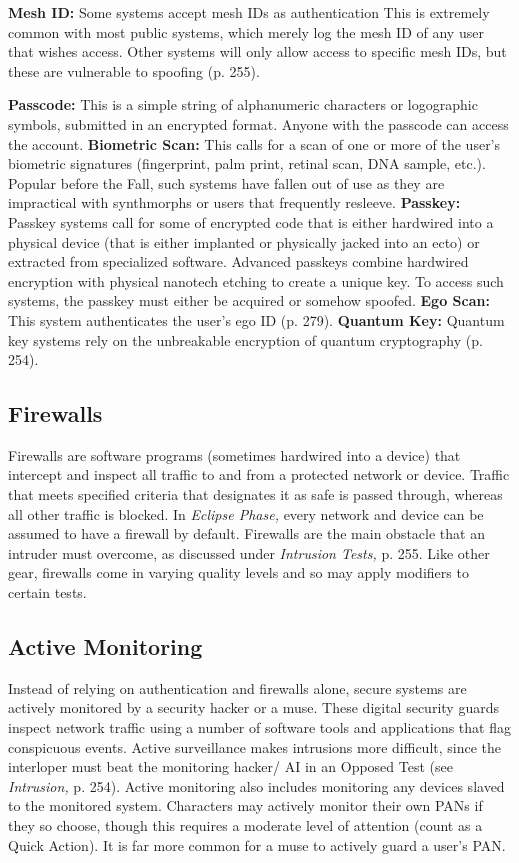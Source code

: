 \textbf{Mesh ID:} Some systems accept mesh IDs as authentication
This is extremely common with most public
systems, which merely log the mesh ID of any user 
that wishes access. Other systems will only allow 
access to specific mesh IDs, but these are vulnerable 
to spoofing (p. 255).

\textbf{Passcode:} This is a simple string of alphanumeric 
characters or logographic symbols, submitted in an 
encrypted format. Anyone with the passcode can 
access the account.
\textbf{Biometric Scan:} This calls for a scan of one or more 
of the user's biometric signatures (fingerprint, palm 
print, retinal scan, DNA sample, etc.). Popular before 
the Fall, such systems have fallen out of use as they 
are impractical with synthmorphs or users that frequently
resleeve.
\textbf{Passkey:} Passkey systems call for some of encrypted 
code that is either hardwired into a physical device 
(that is either implanted or physically jacked into 
an ecto) or extracted from specialized software. Advanced
passkeys combine hardwired encryption with
physical nanotech etching to create a unique key. To 
access such systems, the passkey must either be acquired
or somehow spoofed.
\textbf{Ego Scan:} This system authenticates the user's ego 
ID (p. 279).
\textbf{Quantum Key:} Quantum key systems rely on the unbreakable
encryption of quantum cryptography (p. 254).

\subsection{Firewalls}

Firewalls are software programs (sometimes hardwired
into a device) that intercept and inspect all traffic
to and from a protected network or device. Traffic
that meets specified criteria that designates it as safe 
is passed through, whereas all other traffic is blocked. 
In \textit{Eclipse Phase,} every network and device can be 
assumed to have a firewall by default. Firewalls are 
the main obstacle that an intruder must overcome, as 
discussed under \textit{Intrusion Tests,} p. 255.
Like other gear, firewalls come in varying quality 
levels and so may apply modifiers to certain tests.

\subsection{Active Monitoring}

Instead of relying on authentication and firewalls 
alone, secure systems are actively monitored by a security
hacker or a muse. These digital security guards
inspect network traffic using a number of software 
tools and applications that flag conspicuous events. 
Active surveillance makes intrusions more difficult, 
since the interloper must beat the monitoring hacker/
AI in an Opposed Test (see \textit{Intrusion,} p. 254). Active 
monitoring also includes monitoring any devices 
slaved to the monitored system.
Characters may actively monitor their own PANs if 
they so choose, though this requires a moderate level 
of attention (count as a Quick Action). It is far more 
common for a muse to actively guard a user's PAN.

